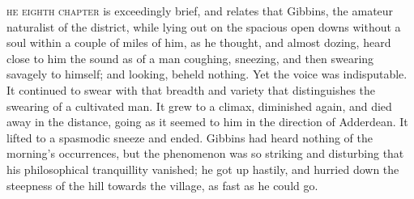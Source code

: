 \label{ch:08}
\begin{ChapterStart}
\vspace*{2\nbs}

\vspace{1.5\nbs}
\end{ChapterStart}

\kern-3pt\textsc{he eighth chapter} is exceedingly brief, and relates that Gibbins, the amateur naturalist of the district, while lying out on the spacious open downs without a soul within a couple of miles of him, as he thought, and almost dozing, heard close to him the sound as of a man coughing, sneezing, and then swearing savagely to himself; and looking, beheld nothing. Yet the voice was indisputable. It continued to swear with that breadth and variety that distinguishes the swearing of a cultivated man. It grew to a climax, diminished again, and died away in the distance, going as it seemed to him in the direction of Adderdean. It lifted to a spasmodic sneeze and ended. Gibbins had heard nothing of the morning's occurrences, but the phenomenon was so striking and disturbing that his philosophical tranquillity vanished; he got up hastily, and hurried down the steepness of the hill towards the village, as fast as he could go.